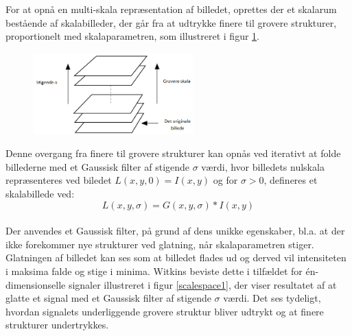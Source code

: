 For at opnå en multi-skala repræsentation af billedet, oprettes der et skalarum bestående af skalabilleder, der går fra at udtrykke finere til grovere strukturer, proportionelt med skalaparametren, som illustreret i figur \ref{fig:scalerep}. 
\begin{figure}[H]
    \centering
    \includegraphics[width=0.55\textwidth]{fig/32.png}
     \vspace{-1em}
    \begin{center}    
       \caption{\textcolor{gray}{\footnotesize \textit{ }}}
    \label{fig:scalerep}
     \end{center}
     \vspace{-2.5em}
  \end{figure} \noindent
Denne overgang fra finere til grovere strukturer kan opnås ved iterativt at folde billederne med et Gaussisk filter af stigende $\sigma$ værdi, hvor billedets nulskala repræsenteres ved biledet $ L(x,y,0) = I(x,y)$ og for $\sigma>0$, defineres et skalabillede ved:
\begin{equation}
L(x,y,\sigma) = G(x,y,\sigma)\ast I(x,y)
\label{scalespace1}
\end{equation}
\\
Der anvendes et Gaussisk filter, på grund af dens unikke egenskaber,  bl.a. at der ikke forekommer nye strukturer ved glatning, når skalaparametren stiger. Glatningen af billedet kan ses som at billedet flades ud og derved vil intensiteten i maksima falde og stige i minima.  Witkins \cite{witkins} beviste dette i tilfældet for én-dimensionselle signaler illustreret i  figur  \ref{scalespace1}, der viser resultatet af at glatte et signal med et Gaussisk filter af stigende $\sigma$ værdi. Det ses tydeligt, hvordan signalets underliggende grovere struktur bliver udtrykt og at finere strukturer undertrykkes.
